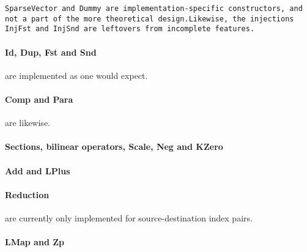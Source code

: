 \tt{SparseVector} and \tt{Dummy} are implementation-specific constructors, and not a part of the more theoretical design.Likewise, the injections \tt{InjFst} and \tt{InjSnd} are leftovers from incomplete features.

\paragraph{Id, Dup, Fst and Snd} are implemented as one would expect.


\paragraph{Comp and Para} are likewise.


\paragraph{Sections, bilinear operators, Scale, Neg and KZero}


\paragraph{Add and LPlus}

\paragraph{Reduction} are currently only implemented for source-destination index pairs.


\paragraph{LMap and Zp}
